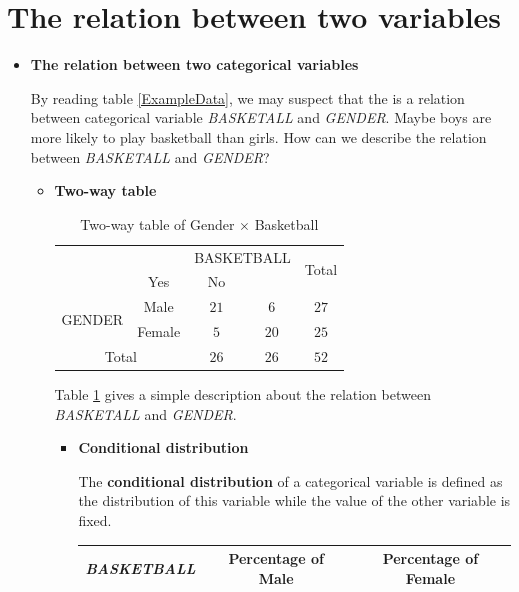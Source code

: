 \documentclass[a4paper, 12pt,twoside]{book}
\begin{document}
\section{The relation between two variables}
\begin{itemize}
\item \textbf{The relation between two categorical variables}
\vspace{0.6cm}

By reading table \ref{ExampleData}, we may suspect that the is a relation between categorical variable \textit{BASKETALL} and \textit{GENDER}. Maybe boys are more likely to play basketball than girls. How can we describe the relation between  \textit{BASKETALL} and \textit{GENDER}?
\begin{itemize}
\item \textbf{Two-way table}
\begin{table}[H]
\begin{center}
 \begin{tabular}{c|cccc}
\hline
\multicolumn{2}{c}{}&\multicolumn{2}{c}{BASKETBALL}&\multirow{2}{*}{Total}\\
\hhline{~~--~}
\multicolumn{2}{c}{}&\multicolumn{1}{c}{Yes}&\multicolumn{1}{c}{No}&\\
\multirow{2}{*}{GENDER}&Male&$21$&$6$&$27$\\
&Female&$5$&$20$&$25$\\
\multicolumn{2}{c}{Total}&$26$&$26$&$52$\\
\hline
 \end{tabular}
\caption{Two-way table of Gender $\times$ Basketball}
\label{Two-way table}
\end{center}
\end{table}
Table \ref{Two-way table} gives a simple description about the relation between \textit{BASKETALL} and \textit{GENDER}.
\begin{itemize}
 \item \textbf{Conditional distribution}
 \vspace{0.6cm}
 
 The \textbf{conditional distribution} of a categorical variable is defined as the distribution of this variable while the value of the other variable is fixed.
 \vspace{0.6cm}
 
 \begin{table}[H]
 \hspace{3cm}
 \begin{tabular}{ccc}
  \vspace{0.2cm}
 \textit{BASKETBALL}&Percentage of Male&Percentage of Female\\
 \hline
 

\end{tabular}
\end{table}
\end{itemize}
\end{itemize}
\end{itemize}
\end{document}
